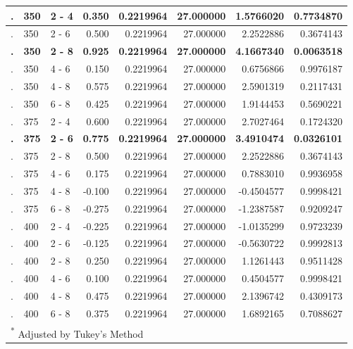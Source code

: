 \documentclass[12pt,]{article}
\begin{document}
\begin{table}[H]
\begin{tabular}{l|l|l|r|r|r|r|r}
. & 350 & 2 - 4 & 0.350 & 0.2219964 & 27.000000 & 1.5766020 & 0.7734870\\
\hline
. & 350 & 2 - 6 & 0.500 & 0.2219964 & 27.000000 & 2.2522886 & 0.3674143\\
\hline
\rowcolor[HTML]{EAFAF1}  \textbf{.} & \textbf{350} & \textbf{2 - 8} & \textbf{0.925} & \textbf{0.2219964} & \textbf{27.000000} & \textbf{4.1667340} & \textbf{0.0063518}\\
\hline
. & 350 & 4 - 6 & 0.150 & 0.2219964 & 27.000000 & 0.6756866 & 0.9976187\\
\hline
. & 350 & 4 - 8 & 0.575 & 0.2219964 & 27.000000 & 2.5901319 & 0.2117431\\
\hline
. & 350 & 6 - 8 & 0.425 & 0.2219964 & 27.000000 & 1.9144453 & 0.5690221\\
\hline
. & 375 & 2 - 4 & 0.600 & 0.2219964 & 27.000000 & 2.7027464 & 0.1724320\\
\hline
\rowcolor[HTML]{EAFAF1}  \textbf{.} & \textbf{375} & \textbf{2 - 6} & \textbf{0.775} & \textbf{0.2219964} & \textbf{27.000000} & \textbf{3.4910474} & \textbf{0.0326101}\\
\hline
. & 375 & 2 - 8 & 0.500 & 0.2219964 & 27.000000 & 2.2522886 & 0.3674143\\
\hline
. & 375 & 4 - 6 & 0.175 & 0.2219964 & 27.000000 & 0.7883010 & 0.9936958\\
\hline
. & 375 & 4 - 8 & -0.100 & 0.2219964 & 27.000000 & -0.4504577 & 0.9998421\\
\hline
. & 375 & 6 - 8 & -0.275 & 0.2219964 & 27.000000 & -1.2387587 & 0.9209247\\
\hline
. & 400 & 2 - 4 & -0.225 & 0.2219964 & 27.000000 & -1.0135299 & 0.9723239\\
\hline
. & 400 & 2 - 6 & -0.125 & 0.2219964 & 27.000000 & -0.5630722 & 0.9992813\\
\hline
. & 400 & 2 - 8 & 0.250 & 0.2219964 & 27.000000 & 1.1261443 & 0.9511428\\
\hline
. & 400 & 4 - 6 & 0.100 & 0.2219964 & 27.000000 & 0.4504577 & 0.9998421\\
\hline
. & 400 & 4 - 8 & 0.475 & 0.2219964 & 27.000000 & 2.1396742 & 0.4309173\\
\hline
. & 400 & 6 - 8 & 0.375 & 0.2219964 & 27.000000 & 1.6892165 & 0.7088627\\
\hline
\multicolumn{8}{l}{\textsuperscript{*} Adjusted by Tukey's Method}\\
\end{tabular}
\endgroup{}
\end{table}
\end{document}
